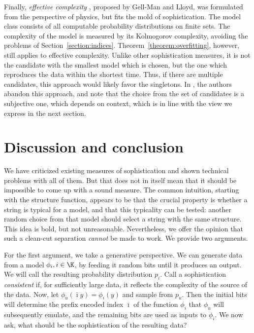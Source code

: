 Finally, \emph{effective complexity} \cite{gellmann1996information}, proposed by Gell-Man and Lloyd, was formulated from the perspective of physics, but fits the mold of sophistication. The model class consists of all computable probability distributions on finite sets. The complexity of the model is measured by its Kolmogorov complexity, avoiding the problems of Section~\ref{section:indices}. Theorem~\ref{theorem:overfitting}, however, still applies to effective complexity. Unlike other sophistication measures, it is not the candidate with the smallest model which is chosen, but the one which reproduces the data within the shortest time. Thus, if there are multiple candidates, this approach would likely favor the singletons. In \cite{gell2004nonextensive}, the authors abandon this approach, and note that the choice from the set of candidates is a subjective one, which depends on context, which is in line with the view we express in the next section.

\section{Discussion and conclusion}
\label{section:conclusion} 

We have criticized existing measures of sophistication and shown technical problems with all of them. But that does not in itself mean that it should be impossible to come up with a sound measure. The common intuition, starting with the structure function, appears to be that the crucial property is whether a string is typical for a model, and that this typicality can be tested: another random choice from that model should select a string with the same structure. This idea is bold, but not  unreasonable. Nevertheless, we offer the opinion that such a clean-cut separation \emph{cannot} be made to work. We provide two arguments.

For the first argument, we take a generative perspective. We can generate data from a model $\phi_i, i \in \K$, by feeding it random bits until it produces an output. We will call the resulting probability distribution $p_i$. Call a sophistication \emph{consistent} if, for sufficiently large data, it reflects the complexity of the source of the data. Now, let $\phi_u(\bar\imath y)=\phi_i(y)$ and sample from $p_u$. Then the initial bits will determine the prefix encoded index $\bar\imath$ of the function $\phi_i$ that $\phi_u$ will subsequently emulate, and the remaining bits are used as inputs to $\phi_i$. We now ask, what should be the sophistication of the resulting data? 
 
